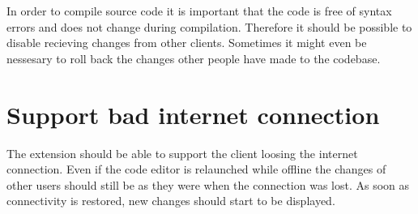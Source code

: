 In order to compile source code it is important that the code is free of syntax errors and does not change during compilation. Therefore it should be possible to disable recieving changes from other clients. Sometimes it might even be nessesary to roll back the changes other people have made to the codebase.

\section{Support bad internet connection}

The extension should be able to support the client loosing the internet connection. Even if the code editor is relaunched while offline the changes of other users should still be as they were when the connection was lost. As soon as connectivity is restored, new changes should start to be displayed. 